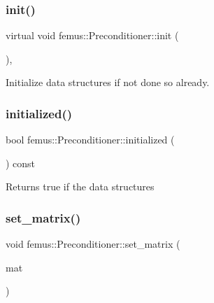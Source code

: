 \subsubsection{\texorpdfstring{init()}{init()}}
{\footnotesize\ttfamily virtual void femus\+::\+Preconditioner\+::init (\begin{DoxyParamCaption}{ }\end{DoxyParamCaption})\hspace{0.3cm}{\ttfamily [inline]}, {\ttfamily [virtual]}}

Initialize data structures if not done so already. \mbox{\label{classfemus_1_1_preconditioner_aa1fcb677c98cfa1bca573299e06e062d}} 
\subsubsection{\texorpdfstring{initialized()}{initialized()}}
{\footnotesize\ttfamily bool femus\+::\+Preconditioner\+::initialized (\begin{DoxyParamCaption}{ }\end{DoxyParamCaption}) const\hspace{0.3cm}{\ttfamily [inline]}}

\begin{DoxyReturn}{Returns}
true if the data structures 
\end{DoxyReturn}
\mbox{\label{classfemus_1_1_preconditioner_a1bc0544da19e5de757d83ae2e4fb90de}} 
\subsubsection{\texorpdfstring{set\+\_\+matrix()}{set\_matrix()}}
{\footnotesize\ttfamily void femus\+::\+Preconditioner\+::set\+\_\+matrix (\begin{DoxyParamCaption}\item[{\mbox{\hyperlink{classfemus_1_1_sparse_matrix}{Sparse\+Matrix}} \&}]{mat }\end{DoxyParamCaption})\hspace{0.3cm}{\ttfamily [inline]}}

